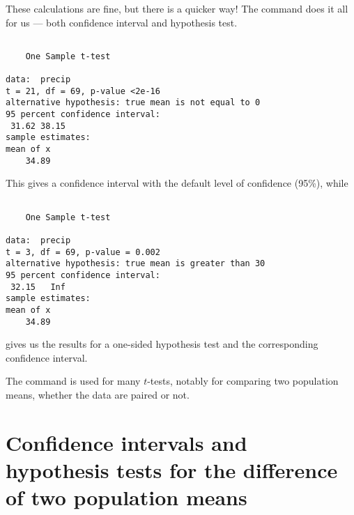 These calculations are fine, but there is a quicker way! The  command does it all for us --- both confidence interval and hypothesis test. 
\begin{knitrout}
\color{fgcolor}\begin{kframe}
\begin{alltt}
\hlstd{> }
\end{alltt}
\begin{verbatim}

	One Sample t-test

data:  precip
t = 21, df = 69, p-value <2e-16
alternative hypothesis: true mean is not equal to 0
95 percent confidence interval:
 31.62 38.15
sample estimates:
mean of x 
    34.89 
\end{verbatim}
\end{kframe}
\end{knitrout}
This gives a confidence interval with the default level of confidence (95\%), while 
\begin{knitrout}
\color{fgcolor}\begin{kframe}
\begin{alltt}
\hlstd{> } \hlstd{=}\hlstd{,} \hlstd{=}\hlstd{)}
\end{alltt}
\begin{verbatim}

	One Sample t-test

data:  precip
t = 3, df = 69, p-value = 0.002
alternative hypothesis: true mean is greater than 30
95 percent confidence interval:
 32.15   Inf
sample estimates:
mean of x 
    34.89 
\end{verbatim}
\end{kframe}
\end{knitrout}
gives us the results for a one-sided hypothesis test and the corresponding confidence interval. 
 
The  command is used for many $t$-tests, notably for comparing two population means, whether the data are paired or not. 
 
\section{Confidence intervals and hypothesis tests for the difference of two population means} 
 
